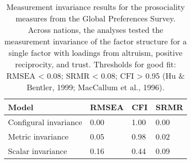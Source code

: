 \documentclass[
  man,floatsintext]{apa6}
\begin{document}
\begin{table}[h]
\begin{center}
\begin{threeparttable}
\end{threeparttable}
\end{center}

\end{table}

\newpage



\begin{table}[h]

\begin{center}
\begin{threeparttable}

\caption{\label{tab:tableInvarianceGPS}Measurement invariance results for the prosociality measures from the Global Preferences Survey. Across nations, the analyses tested the measurement invariance of the factor structure for a single factor with loadings from altruism, positive reciprocity, and trust. Thresholds for good fit: RMSEA \textless{} 0.08; SRMR \textless{} 0.08; CFI \textgreater{} 0.95 (Hu \& Bentler, 1999; MacCallum et al., 1996).}

\begin{tabular}{m{4cm}m{3cm}m{3cm}m{3cm}}
\toprule
Model & \multicolumn{1}{c}{RMSEA} & \multicolumn{1}{c}{CFI} & \multicolumn{1}{c}{SRMR}\\
\midrule
Configural invariance & 0.00 & 1.00 & 0.00\\
Metric invariance & 0.05 & 0.98 & 0.02\\
Scalar invariance & 0.16 & 0.44 & 0.09\\
\bottomrule
\end{tabular}

\end{threeparttable}
\end{center}

\end{table}

\newpage
\end{document}
